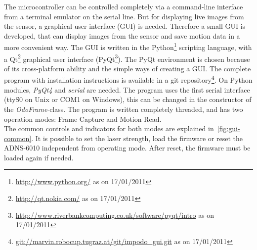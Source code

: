 \documentclass[12pt,a4paper]{article}
\begin{document}
The microcontroller can be controlled completely via a command-line interface from a terminal emulator on the serial line.
But for displaying live images from the sensor, a graphical user interface (GUI) is needed.
Therefore a small GUI is developed, that can display images from the sensor and save motion data in a more convenient way.
The GUI is written in the Python\footnote{\url{http://www.python.org/} as on 17/01/2011} scripting language, with a Qt\footnote{\url{http://qt.nokia.com/} as on 17/01/2011} graphical user interface (PyQt\footnote{\url{http://www.riverbankcomputing.co.uk/software/pyqt/intro} as on 17/01/2011}).
The PyQt environment is chosen because of its cross-platform ability and the simple ways of creating a GUI.
The complete program with installation instructions is available in a git repository\footnote{\url{git://marvin.robocup.tugraz.at/git/impodo_gui.git} as on 17/01/2011}.
On Python modules, \emph{PyQt4} and \emph{serial} are needed.
The program uses the first serial interface (ttyS0 on Unix or COM1 on Windows), this can be changed in the constructor of the \emph{OdoFrame}-class.
The program is written completely threaded, and has two operation modes: Frame Capture and Motion Read.\\
The common controls and indicators for both modes are explained in~\autoref{fig:gui-common}.
It is possible to set the laser strength, load the firmware or reset the ADNS-6010 independent from operating mode.
After reset, the firmware must be loaded again if needed.
\end{document}
